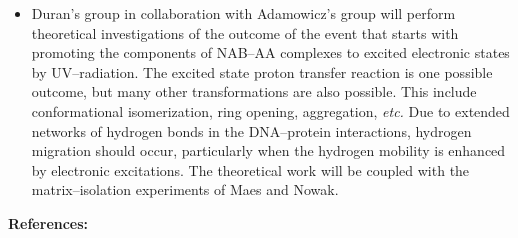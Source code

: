 \begin{itemize}
\item
Duran's group in collaboration with Adamowicz's group will perform
theoretical investigations
of the outcome of the event that starts with promoting the 
components of NAB--AA complexes to excited electronic states by 
UV--radiation. The excited state proton transfer reaction is one
possible outcome, but many other transformations are also 
possible. This include conformational isomerization, ring
opening, aggregation, {\it etc.} Due to extended networks of hydrogen
bonds in the DNA--protein interactions, hydrogen migration
should occur, particularly when the hydrogen mobility is enhanced
by electronic excitations. 
The theoretical work will be coupled with the matrix--isolation
experiments of Maes and Nowak.

\end{itemize}

\newpage

\noindent
{\bf References:}


